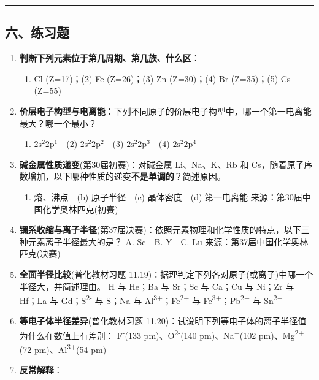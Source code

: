 \begin{center}\rule{0.5\linewidth}{0.5pt}\end{center}

\subsection{六、练习题}\label{ux516dux7ec3ux4e60ux9898}

\begin{enumerate}
\def\labelenumi{\arabic{enumi}.}
\item
  \textbf{判断下列元素位于第几周期、第几族、什么区}：

  \begin{enumerate}
  \def\labelenumii{(\arabic{enumii})}
  \tightlist
  \item
    Cl (Z=17)；(2) Fe (Z=26)；(3) Zn (Z=30)；(4) Br (Z=35)；(5) Cs (Z=55)
  \end{enumerate}
\item
  \textbf{价层电子构型与电离能}：下列不同原子的价层电子构型中，哪一个第一电离能最大？哪一个最小？

  \begin{enumerate}
  \def\labelenumii{(\arabic{enumii})}
  \tightlist
  \item
    \(2\mathrm{s}^2 2\mathrm{p}^1\)　(2) \(2\mathrm{s}^2 2\mathrm{p}^2\)　(3) \(2\mathrm{s}^2 2\mathrm{p}^3\)　(4) \(2\mathrm{s}^2 2\mathrm{p}^4\)
  \end{enumerate}
\item
  \textbf{碱金属性质递变}(第30届初赛)：对碱金属 Li、Na、K、Rb 和 Cs，随着原子序数增加，以下哪种性质的递变\textbf{不是单调的}？简述原因。

  \begin{enumerate}
  \def\labelenumii{(\alph{enumii})}
  \tightlist
  \item
    熔、沸点　(b) 原子半径　(c) 晶体密度　(d) 第一电离能
    来源：第30届中国化学奥林匹克(初赛)
  \end{enumerate}
\item
  \textbf{镧系收缩与离子半径}(第37届决赛)：依照元素物理和化学性质的特点，以下三种元素离子半径最大的是？
  A. Sc　B. Y　C. Lu
  来源：第37届中国化学奥林匹克(决赛)
\item
  \textbf{全面半径比较}(普化教材习题 11.19)：据理判定下列各对原子(或离子)中哪一个半径大，并简述理由。
  H 与 He；Ba 与 Sr；Sc 与 Ca；Cu 与 Ni；Zr 与 Hf；La 与 Gd；S\textsuperscript{2-} 与 S；Na 与 Al\textsuperscript{3+}；Fe\textsuperscript{2+} 与 Fe\textsuperscript{3+}；Pb\textsuperscript{2+} 与 Sn\textsuperscript{2+}
\item
  \textbf{等电子体半径差异}(普化教材习题 11.20)：试说明下列等电子体的离子半径值为什么在数值上有差别：
  F\textsuperscript{-}(133 pm)、O\textsuperscript{2-}(140 pm)、Na\textsuperscript{+}(102 pm)、Mg\textsuperscript{2+}(72 pm)、Al\textsuperscript{3+}(54 pm)
\item
  \textbf{反常解释}：


\end{enumerate}
